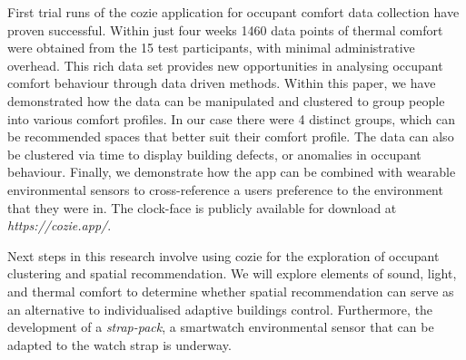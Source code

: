 
First trial runs of the cozie application for occupant comfort data collection have proven successful. Within just four weeks 1460 data points of thermal comfort were obtained from the 15 test participants, with minimal administrative overhead. This rich data set provides new opportunities in analysing occupant comfort behaviour through data driven methods. Within this paper, we have demonstrated how the data can be manipulated and clustered to group people into various comfort profiles. In our case there were 4 distinct groups, which can be recommended spaces that better suit their comfort profile. The data can also be clustered via time to display building defects, or anomalies in occupant behaviour. Finally, we demonstrate how the app can be combined with wearable environmental sensors to cross-reference a users preference to the environment that they were in. The clock-face is publicly available for download at \emph{https://cozie.app/}.

Next steps in this research involve using cozie for the exploration of occupant clustering and spatial recommendation. We will explore elements of sound, light, and thermal comfort to determine whether spatial recommendation can serve as an alternative to individualised adaptive buildings control. Furthermore, the development of a \emph{strap-pack}, a smartwatch environmental sensor that can be adapted to the watch strap is underway. 